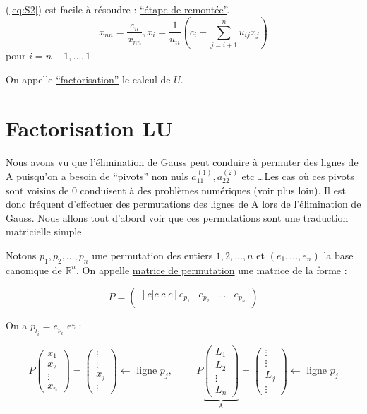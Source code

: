 \documentclass[a4paper,11pt]{article}
\newcommand{\reff}[1]{(\ref{#1})}
\newcommand{\R}{\mathbb{R}}
\theoremstyle{plain} %
\begin{document}
\reff{eq:S2} est facile à résoudre : \underline{``étape de remontée''}.
\[
    x_{nn} = \frac{c_n}{x_{nn}}, x_i = \frac{1}{u_{ii}}(c_i - \sum_{j=i+1}^{n}u_{ij}x_j )
\] pour $i = n-1, \dots, 1$

\begin{remark}
    On appelle \underline{``factorisation''} le calcul de $U$.
\end{remark}









\section{Factorisation LU}
Nous avons vu que l'élimination de Gauss peut conduire à permuter des lignes de A puisqu'on a besoin de ``pivots'' non nuls $a_{11}^{(1)}, a_{22}^{(2)}$ etc \dots Les cas où ces pivots sont voisins de 0 conduisent à des problèmes numériques (voir plus loin). Il est donc fréquent d'effectuer des permutations des lignes de A lors de l'élimination de Gauss.
Nous allons tout d'abord voir que ces permutations sont une traduction matricielle simple.

Notons ${p_1,p_2,\dots,p_n}$ une permutation des entiers ${1,2,\dots,n}$ et $(e_1,\dots,e_n)$ la base canonique de $\R^n$. On appelle \underline{matrice de permutation} une matrice de la forme :

\[
    P =
    \begin{pmatrix}[c|c|c|c]
        e_{p_1} & e_{p_2} & \dots & e_{p_n}\\
\end{pmatrix} 
\]

On a $p_{l_i} = e_{p_i}$ et :

\[
    P
    \begin{pmatrix}
        x_1 \\ x_2 \\ \vdots \\ x_n
    \end{pmatrix}
    =
    \begin{pmatrix}
        \vdots \\ \vdots \\ x_j \\ \vdots
    \end{pmatrix}
    \text{$\leftarrow$ ligne $p_j$}, \hspace{1cm}
    P
    \underbrace{\begin{pmatrix}
        L_1 \\
        L_2 \\
        \vdots \\
        L_n
    \end{pmatrix}
    }_\text{A}
    =
    \begin{pmatrix}
        \vdots \\
        \vdots \\
        L_j \\ 
        \vdots
    \end{pmatrix}
    \text{$\leftarrow$ ligne $p_j$}
\]
\end{document}
